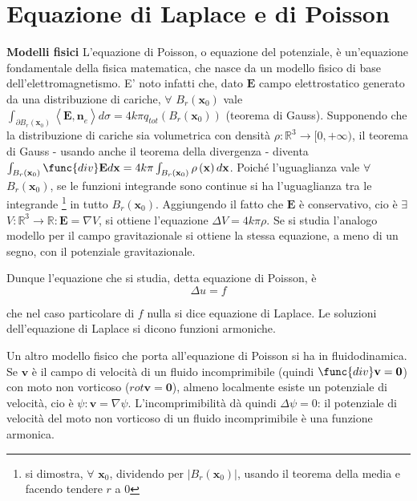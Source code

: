 \documentclass{article}
\begin{document}
\section{Equazione di Laplace e di Poisson}

\textbf{Modelli fisici} L'equazione di Poisson, o equazione del potenziale, 
\`{e} un'equazione fondamentale della fisica matematica, che nasce da un
modello fisico di base dell'elettromagnetismo. E' noto infatti che, dato $%
\mathbf{E}$ campo elettrostatico generato da una distribuzione di cariche, $%
\forall $ $B_{r}\left( \mathbf{x}_{0}\right) $ vale $\int_{\partial
B_{r}\left( \mathbf{x}_{0}\right) }\left\langle \mathbf{E,n}%
_{e}\right\rangle d\sigma =4k\pi q_{tot}\left( B_{r}\left( \mathbf{x}%
_{0}\right) \right) $ (teorema di Gauss). Supponendo che la distribuzione di
cariche sia volumetrica con densit\`{a} $\rho :%
\mathbb{R}
^{3}\rightarrow \lbrack 0,+\infty )$, il teorema di Gauss - usando anche il
teorema della divergenza - diventa $\int_{B_{r}\left( \mathbf{x}_{0}\right) }%
\func{div}\mathbf{E}d\mathbf{x}=4k\pi \int_{B_{r}\left( \mathbf{x}%
_{0}\right) }\rho \left( \mathbf{x}\right) d\mathbf{x}$. Poich\'{e}
l'uguaglianza vale $\forall $ $B_{r}\left( \mathbf{x}_{0}\right) $, se le
funzioni integrande sono continue si ha l'uguaglianza tra le integrande%
\footnote{%
si dimostra, $\forall $ $\mathbf{x}_{0}$, dividendo per $\left\vert
B_{r}\left( \mathbf{x}_{0}\right) \right\vert $, usando il teorema della
media e facendo tendere $r$ a $0$} in tutto $B_{r}\left( \mathbf{x}%
_{0}\right) $. Aggiungendo il fatto che $\mathbf{E}$ \`{e} conservativo, cio%
\`{e} $\exists $ $V:%
\mathbb{R}
^{3}\rightarrow 
\mathbb{R}
:\mathbf{E}=\nabla V$, si ottiene l'equazione $\Delta V=4k\pi \rho $. Se si
studia l'analogo modello per il campo gravitazionale si ottiene la stessa
equazione, a meno di un segno, con il potenziale gravitazionale.

Dunque l'equazione che si studia, detta equazione di Poisson, \`{e} 
\begin{equation*}
\Delta u=f
\end{equation*}

che nel caso particolare di $f$ nulla si dice equazione di Laplace. Le
soluzioni dell'equazione di Laplace si dicono funzioni armoniche.

Un altro modello fisico che porta all'equazione di Poisson si ha in
fluidodinamica. Se $\mathbf{v}$ \`{e} il campo di velocit\`{a} di un fluido
incomprimibile (quindi $\func{div}\mathbf{v=0}$) con moto non vorticoso ($rot%
\mathbf{v=0}$), almeno localmente esiste un potenziale di velocit\`{a}, cio%
\`{e} $\psi :\mathbf{v}=\nabla \psi $. L'incomprimibilit\`{a} d\`{a} quindi $%
\Delta \psi =0$: il potenziale di velocit\`{a} del moto non vorticoso di un
fluido incomprimibile \`{e} una funzione armonica.
\end{document}
